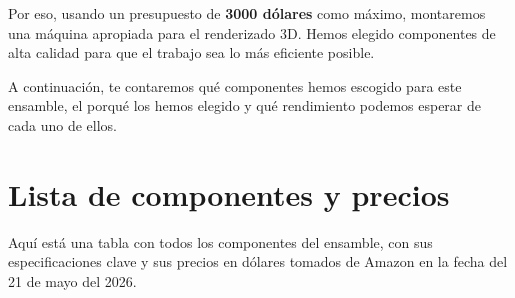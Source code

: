 \documentclass[12pt,a4paper]{article}
\begin{document}
	Por eso, usando un presupuesto de \textbf{3000 dólares} como máximo, montaremos una máquina apropiada para el renderizado 3D. Hemos elegido componentes de alta calidad para que el trabajo sea lo más eficiente posible.
	
	A continuación, te contaremos qué componentes hemos escogido para este ensamble, el porqué los hemos elegido y qué rendimiento podemos esperar de cada uno de ellos.
	
	\clearpage
	
	\section{Lista de componentes y precios}
	Aquí está una tabla con todos los componentes del ensamble, con sus especificaciones clave y sus precios en dólares tomados de Amazon en la fecha del 21 de mayo del 2026.
	
\end{document}
